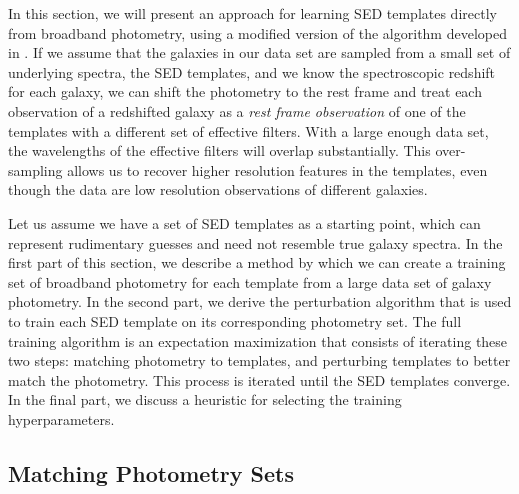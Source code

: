 
\label{sect:template_training}

In this section, we will present an approach for learning SED templates directly from broadband photometry, using a modified version of the algorithm developed in \citet{Budavari2000b}. 
If we assume that the galaxies in our data set are sampled from a small set of underlying spectra, the SED templates, and we know the spectroscopic redshift for each galaxy, we can shift the photometry to the rest frame and treat each observation of a redshifted galaxy as a \textit{rest frame observation} of one of the templates with a different set of effective filters. 
With a large enough data set, the wavelengths of the effective filters will overlap substantially. 
This over-sampling allows us to recover higher resolution features in the templates, even though the data are low resolution observations of different galaxies.

Let us assume we have a set of SED templates as a starting point, which can represent rudimentary guesses and need not resemble true galaxy spectra. 
In the first part of this section, we describe a method by which we can create a training set of broadband photometry for each template from a large data set of galaxy photometry. 
In the second part, we derive the perturbation algorithm that is used to train each SED template on its corresponding photometry set. 
The full training algorithm is an expectation maximization that consists of iterating these two steps: matching photometry to templates, and perturbing templates to better match the photometry.
This process is iterated until the SED templates converge. 
In the final part, we discuss a heuristic for selecting the training hyperparameters.




\subsection{Matching Photometry Sets}
\label{sect:training_sets}
        
